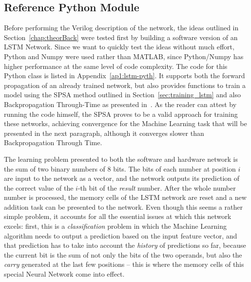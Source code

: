 \subsection{Reference Python Module}\label{sec:res-pyth}
Before performing the Verilog description of the network, the ideas outlined in Section~\ref{chap:theorBack} were tested first by building a software version of an LSTM Network.
Since we want to quickly test the ideas without much effort, Python and Numpy were used rather than MATLAB, since Python/Numpy has higher performance at the same level of
code complexity. The code for this Python class is listed in Appendix~\ref{ap1:lstm-pyth}. It supports both the forward propagation of an already trained network, but also provides
functions to train a model using the SPSA method outlined in Section~\ref{sec:training_lstm} and also Backpropagation Through-Time as presented in~\cite{Greff15}. As the reader can attest
by running the code himself, the SPSA proves to be a valid approach for training these networks, achieving convergence for the Machine Learning task that will be presented in the next paragraph,
although it converges slower than Backpropagation Through Time.

The learning problem presented to both the software and hardware network is the sum of two binary numbers of 8 bits. The bits of each number at position $i$ are input to the network as a vector,
and the network outputs its prediction of the correct value of the $i$-th bit of the \emph{result} number. After the whole number number is processed, the memory cells of the LSTM network are reset
and a new addition task can be presented to the network. Even though this seems a rather simple problem, it accounts for all the essential issues at which this network excels: first, this is
a \emph{classification} problem in which the Machine Learning algorithm needs to output a prediction based on the input feature vector, and that prediction has to take into account the \emph{history}
of predictions so far, because the current bit is the sum of not only the bits of the two operands, but also the \emph{carry} generated at the last few positions -- this is where the memory cells of
this special Neural Network come into effect.

